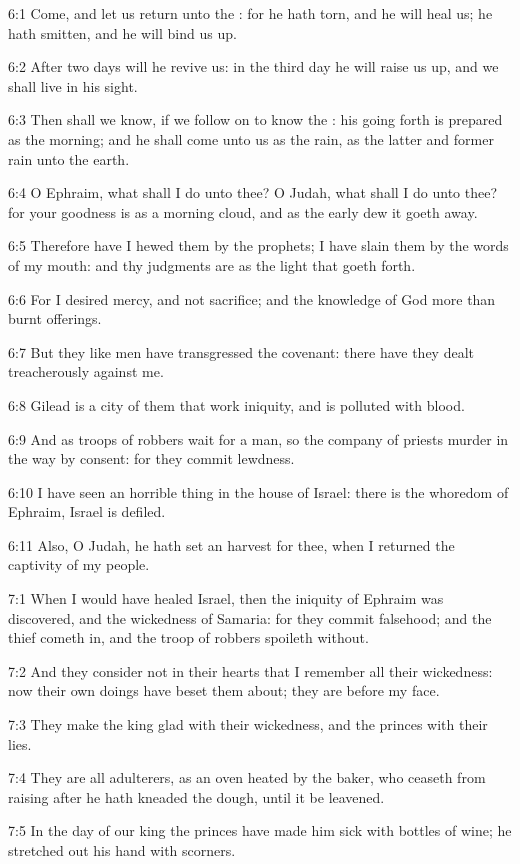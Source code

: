 6:1 Come, and let us return unto the \LORD: for he hath torn, and he will heal us; he hath smitten, and he will bind us up.

6:2 After two days will he revive us: in the third day he will raise us up, and we shall live in his sight.

6:3 Then shall we know, if we follow on to know the \LORD: his going forth is prepared as the morning; and he shall come unto us as the rain, as the latter and former rain unto the earth.

6:4 O Ephraim, what shall I do unto thee? O Judah, what shall I do unto thee? for your goodness is as a morning cloud, and as the early dew it goeth away.

6:5 Therefore have I hewed them by the prophets; I have slain them by the words of my mouth: and thy judgments are as the light that goeth forth.

6:6 For I desired mercy, and not sacrifice; and the knowledge of God more than burnt offerings.

6:7 But they like men have transgressed the covenant: there have they dealt treacherously against me.

6:8 Gilead is a city of them that work iniquity, and is polluted with blood.

6:9 And as troops of robbers wait for a man, so the company of priests murder in the way by consent: for they commit lewdness.

6:10 I have seen an horrible thing in the house of Israel: there is the whoredom of Ephraim, Israel is defiled.

6:11 Also, O Judah, he hath set an harvest for thee, when I returned the captivity of my people.

7:1 When I would have healed Israel, then the iniquity of Ephraim was discovered, and the wickedness of Samaria: for they commit falsehood; and the thief cometh in, and the troop of robbers spoileth without.

7:2 And they consider not in their hearts that I remember all their wickedness: now their own doings have beset them about; they are before my face.

7:3 They make the king glad with their wickedness, and the princes with their lies.

7:4 They are all adulterers, as an oven heated by the baker, who ceaseth from raising after he hath kneaded the dough, until it be leavened.

7:5 In the day of our king the princes have made him sick with bottles of wine; he stretched out his hand with scorners.

